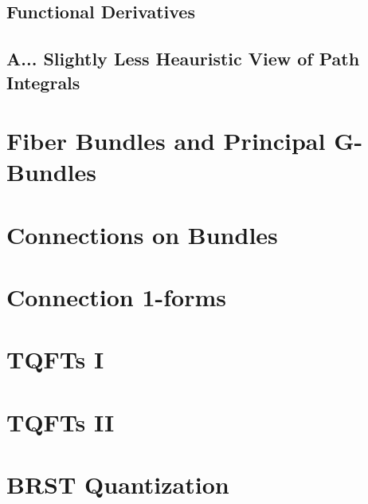 \documentclass[11pt]{article}
\begin{document}
\vskip 0.5cm
\subsection{Functional Derivatives}

\vskip 0.5cm
\subsection{A... Slightly Less Heauristic View of Path Integrals}



\newpage
\section{Fiber Bundles and Principal G-Bundles}
\vskip 0.5cm


\newpage
\section{Connections on Bundles}
\vskip 0.5cm


\newpage
\section{Connection 1-forms}
\vskip 0.5cm


\newpage
\section{TQFTs I}
\vskip 0.5cm


\newpage
\section{TQFTs II}
\vskip 0.5cm


\newpage
\section{BRST Quantization}
\vskip 0.5cm


\newpage
\vskip 0.5cm
\end{document}
